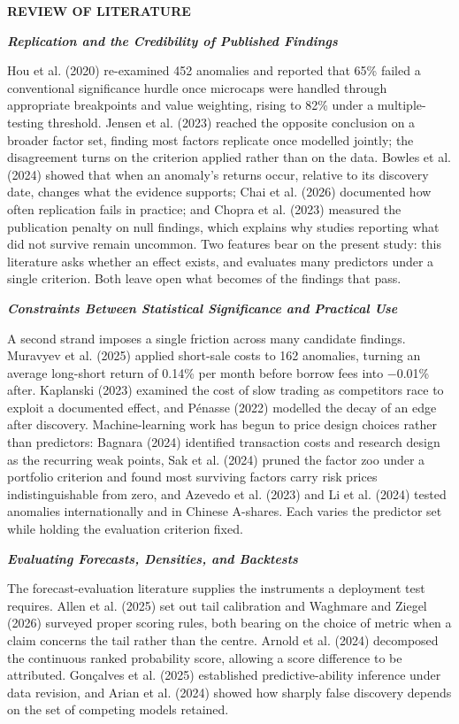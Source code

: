 \documentclass[12pt,a4paper]{article}
\newcommand{\mainhead}[1]{%
  \par\vspace{10pt}\noindent\textbf{\MakeUppercase{#1}}\par\vspace{2pt}}
\newcommand{\subhead}[1]{%
  \par\vspace{6pt}\noindent\textbf{\textit{#1}}\par\vspace{1pt}}
\begin{document}
\mainhead{REVIEW OF LITERATURE}

\subhead{Replication and the Credibility of Published Findings}

Hou et al. (2020) re-examined 452 anomalies and reported that 65\% failed a conventional significance hurdle once microcaps were handled through appropriate breakpoints and value weighting, rising to 82\% under a multiple-testing threshold. Jensen et al. (2023) reached the opposite conclusion on a broader factor set, finding most factors replicate once modelled jointly; the disagreement turns on the criterion applied rather than on the data. Bowles et al. (2024) showed that when an anomaly's returns occur, relative to its discovery date, changes what the evidence supports; Chai et al. (2026) documented how often replication fails in practice; and Chopra et al. (2023) measured the publication penalty on null findings, which explains why studies reporting what did not survive remain uncommon. Two features bear on the present study: this literature asks whether an effect exists, and evaluates many predictors under a single criterion. Both leave open what becomes of the findings that pass.

\subhead{Constraints Between Statistical Significance and Practical Use}

A second strand imposes a single friction across many candidate findings. Muravyev et al. (2025) applied short-sale costs to 162 anomalies, turning an average long-short return of 0.14\% per month before borrow fees into −0.01\% after. Kaplanski (2023) examined the cost of slow trading as competitors race to exploit a documented effect, and Pénasse (2022) modelled the decay of an edge after discovery. Machine-learning work has begun to price design choices rather than predictors: Bagnara (2024) identified transaction costs and research design as the recurring weak points, Sak et al. (2024) pruned the factor zoo under a portfolio criterion and found most surviving factors carry risk prices indistinguishable from zero, and Azevedo et al. (2023) and Li et al. (2024) tested anomalies internationally and in Chinese A-shares. Each varies the predictor set while holding the evaluation criterion fixed.

\subhead{Evaluating Forecasts, Densities, and Backtests}

The forecast-evaluation literature supplies the instruments a deployment test requires. Allen et al. (2025) set out tail calibration and Waghmare and Ziegel (2026) surveyed proper scoring rules, both bearing on the choice of metric when a claim concerns the tail rather than the centre. Arnold et al. (2024) decomposed the continuous ranked probability score, allowing a score difference to be attributed. Gonçalves et al. (2025) established predictive-ability inference under data revision, and Arian et al. (2024) showed how sharply false discovery depends on the set of competing models retained.
\end{document}
